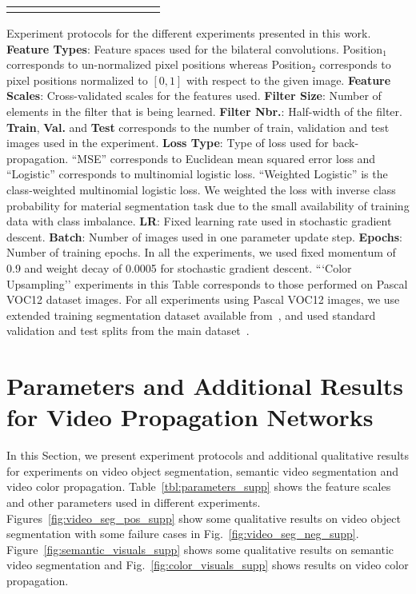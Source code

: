 \begin{table*}[h]
\begin{tabular}{L{2.3cm} L{2.25cm} C{1.5cm} C{0.7cm} C{0.6cm} C{0.7cm} C{0.7cm} C{0.7cm} C{1.6cm} C{0.6cm} C{0.6cm} C{0.6cm}}
      \bottomrule
      \\
    \end{tabular}
     {Experiment protocols for the different experiments presented in this work. \textbf{Feature Types}:
    Feature spaces used for the bilateral convolutions. Position$_1$ corresponds to un-normalized pixel positions whereas Position$_2$ corresponds
    to pixel positions normalized to $[0,1]$ with respect to the given image. \textbf{Feature Scales}: Cross-validated scales for the features used.
     \textbf{Filter Size}: Number of elements in the filter that is being learned. \textbf{Filter Nbr.}: Half-width of the filter. \textbf{Train},
     \textbf{Val.} and \textbf{Test} corresponds to the number of train, validation and test images used in the experiment. \textbf{Loss Type}: Type
     of loss used for back-propagation. ``MSE'' corresponds to Euclidean mean squared error loss and ``Logistic'' corresponds to multinomial logistic
     loss. ``Weighted Logistic'' is the class-weighted multinomial logistic loss. We weighted the loss with inverse class probability for material
     segmentation task due to the small availability of training data with class imbalance. \textbf{LR}: Fixed learning rate used in stochastic gradient
     descent. \textbf{Batch}: Number of images used in one parameter update step. \textbf{Epochs}: Number of training epochs. In all the experiments,
     we used fixed momentum of 0.9 and weight decay of 0.0005 for stochastic gradient descent. ```Color Upsampling'' experiments in this Table corresponds
     to those performed on Pascal VOC12 dataset images. For all experiments using Pascal VOC12 images, we use extended
     training segmentation dataset available from~\cite{hariharan2011moredata}, and used standard validation and test splits
     from the main dataset~\cite{voc2012segmentation}.}
  \label{tbl:parameters}
\end{table*}

\clearpage

\section{Parameters and Additional Results for Video Propagation Networks}

In this Section, we present experiment protocols and additional qualitative results for experiments
on video object segmentation, semantic video segmentation and video color
propagation. Table~\ref{tbl:parameters_supp} shows the feature scales and other parameters used in different experiments.
Figures~\ref{fig:video_seg_pos_supp} show some qualitative results on video object segmentation
with some failure cases in Fig.~\ref{fig:video_seg_neg_supp}.
Figure~\ref{fig:semantic_visuals_supp} shows some qualitative results on semantic video segmentation and
Fig.~\ref{fig:color_visuals_supp} shows results on video color propagation.

